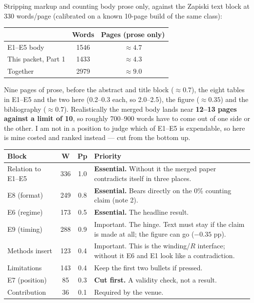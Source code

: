 \documentclass[11pt,a4paper]{article}
\begin{document}
Stripping markup and counting body prose only, against the Zapiski text block at 330 words/page
(calibrated on a known 10-page build of the same class):

\begin{table}[h]
\centering
\small
\begin{tabular}{lcc}
\toprule
 & Words & Pages (prose only) \\
\midrule
E1--E5 body                & 1546 & $\approx 4.7$ \\
This packet, Part 1        & 1433 & $\approx 4.3$ \\
\midrule
Together                   & 2979 & $\approx 9.0$ \\
\bottomrule
\end{tabular}
\end{table}

\noindent Nine pages of prose, before the abstract and title block ($\approx 0.7$), the eight
tables in E1--E5 and the two here (0.2--0.3 each, so 2.0--2.5), the figure ($\approx 0.35$) and the
bibliography ($\approx 0.7$). Realistically the merged body lands near \textbf{12--13 pages against
a limit of 10}, so roughly 700--900 words have to come out of one side or the other. I am not in a
position to judge which of E1--E5 is expendable, so here is mine costed and ranked instead --- cut
from the bottom up.

\begin{table}[h]
\centering
\small
\begin{tabular}{lccp{6.4cm}}
\toprule
Block & W & Pp & Priority \\
\midrule
Relation to E1--E5   & 336 & 1.0 & \textbf{Essential.} Without it the merged paper contradicts itself in three places. \\
E8 (format)          & 249 & 0.8 & \textbf{Essential.} Bears directly on the 0\% counting claim (note 2). \\
E6 (regime)          & 173 & 0.5 & \textbf{Essential.} The headline result. \\
E9 (timing)          & 288 & 0.9 & Important. The hinge. Text must stay if the claim is made at all; the figure can go ($-0.35$ pp). \\
Methods insert       & 123 & 0.4 & Important. This is the winding/$R$ interface; without it E6 and E1 look like a contradiction. \\
Limitations          & 143 & 0.4 & Keep the first two bullets if pressed. \\
E7 (position)        &  85 & 0.3 & \textbf{Cut first.} A validity check, not a result. \\
Contribution         &  36 & 0.1 & Required by the venue. \\
\bottomrule
\end{tabular}
\end{table}
\end{document}

